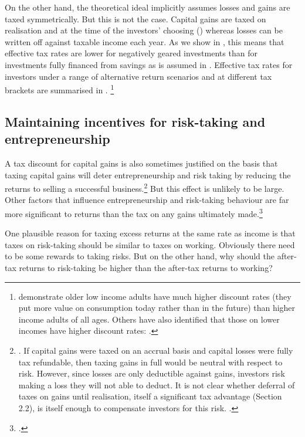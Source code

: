 On the other hand, the theoretical ideal implicitly assumes losses and gains are taxed symmetrically. But this is not the case. Capital gains are taxed on realisation and at the time of the investors’ choosing () whereas losses can be written off against taxable income each year. As we show in , this means that effective tax rates are lower for negatively geared investments than for investments fully financed from savings as is assumed in . Effective tax rates for investors under a range of alternative return scenarios and at different tax brackets are summarised in .%
\footnote{\textcite{GreenMyersonLichtmanEtAl1996} demonstrate older low income adults have much higher discount rates (\ie they put more value on consumption today rather than in the future) than higher income adults of all ages. Others have also identified that those on lower incomes have higher discount rates:  \textcites{ReimersMaylorStewartEtAl2009}{HarrisonLauWilliams2002}.}

\subsection{Maintaining incentives for risk-taking and entrepreneurship}\label{subsubsec:maintain-incentives-for-risk-taking}
A tax discount for capital gains is also sometimes justified on the basis that taxing capital gains will deter entrepreneurship and risk taking by reducing the returns to selling a successful business.\footnote{\textcite[][8--11]{ClemensLammamLo2014}. If capital gains were taxed on an accrual basis and capital losses were fully tax refundable, then taxing gains in full would be neutral with respect to risk. However, since losses are only deductible against gains, investors risk making a loss they will not able to deduct. It is not clear whether deferral of taxes on gains until realisation, itself a significant tax advantage (Section 2.2), is itself enough to compensate investors for this risk. \textcites[8]{Burman2009}[130]{ProductivityCommission2004FirstHomeOwnership}.} 
But this effect is unlikely to be large. Other factors that influence entrepreneurship and risk-taking behaviour are far more significant to returns than the tax on any gains ultimately made.\footcite[][75]{Burman1999} 

One plausible reason for taxing excess returns at the same rate as income is that taxes on risk-taking should be similar to taxes on working. Obviously there need to be some rewards to taking risks. But on the other hand, why should the after-tax returns to risk-taking be higher than the after-tax returns to working? 

